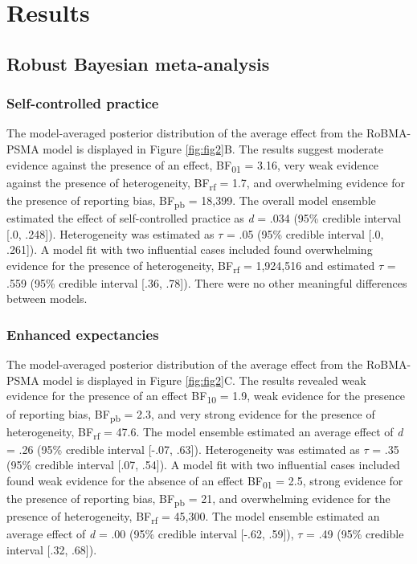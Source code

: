 \documentclass[
  doc, donotrepeattitle,floatsintext]{apa7}
\begin{document}
\hypertarget{results}{%
\section{Results}\label{results}}

\hypertarget{robust-bayesian-meta-analysis-1}{%
\subsection{Robust Bayesian meta-analysis}\label{robust-bayesian-meta-analysis-1}}

\hypertarget{self-controlled-practice}{%
\subsubsection{Self-controlled practice}\label{self-controlled-practice}}

The model-averaged posterior distribution of the average effect from the RoBMA-PSMA model is displayed in Figure \ref{fig:fig2}B. The results suggest moderate evidence against the presence of an effect, BF\textsubscript{01} = 3.16, very weak evidence against the presence of heterogeneity, BF\textsubscript{rf} = 1.7, and overwhelming evidence for the presence of reporting bias, BF\textsubscript{pb} = 18,399. The overall model ensemble estimated the effect of self-controlled practice as \emph{d} = .034 (95\% credible interval {[}.0, .248{]}). Heterogeneity was estimated as \(\tau\) = .05 (95\% credible interval {[}.0, .261{]}). A model fit with two influential cases included found overwhelming evidence for the presence of heterogeneity, BF\textsubscript{rf} = 1,924,516 and estimated \(\tau\) = .559 (95\% credible interval {[}.36, .78{]}). There were no other meaningful differences between models.

\hypertarget{enhanced-expectancies}{%
\subsubsection{Enhanced expectancies}\label{enhanced-expectancies}}

The model-averaged posterior distribution of the average effect from the RoBMA-PSMA model is displayed in Figure \ref{fig:fig2}C. The results revealed weak evidence for the presence of an effect BF\textsubscript{10} = 1.9, weak evidence for the presence of reporting bias, BF\textsubscript{pb} = 2.3, and very strong evidence for the presence of heterogeneity, BF\textsubscript{rf} = 47.6. The model ensemble estimated an average effect of \emph{d} = .26 (95\% credible interval {[}-.07, .63{]}). Heterogeneity was estimated as \(\tau\) = .35 (95\% credible interval {[}.07, .54{]}). A model fit with two influential cases included found weak evidence for the absence of an effect BF\textsubscript{01} = 2.5, strong evidence for the presence of reporting bias, BF\textsubscript{pb} = 21, and overwhelming evidence for the presence of heterogeneity, BF\textsubscript{rf} = 45,300. The model ensemble estimated an average effect of \emph{d} = .00 (95\% credible interval {[}-.62, .59{]}), \(\tau\) = .49 (95\% credible interval {[}.32, .68{]}).
\end{document}
